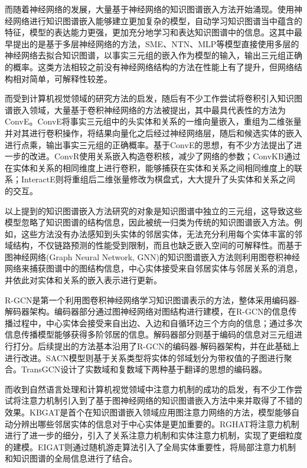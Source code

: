 而随着神经网络的发展，大量基于神经网络的知识图谱嵌入方法开始涌现。使用神经网络进行知识图谱嵌入能够建立更加复杂的模型，自动学习知识图谱当中蕴含的特征，模型的表达能力更强，更加充分地学习和表达知识图谱中的信息。这其中最早提出的是基于多层神经网络的方法，SME、NTN、MLP等模型直接使用多层的神经网络去拟合知识图谱，以事实三元组的嵌入作为模型的输入，输出三元组正确的概率。这类方法相较之前没有神经网络结构的方法在性能上有了提升，但网络结构相对简单，可解释性较差。

而受到计算机视觉领域的研究方法的启发，随后有不少工作尝试将卷积引入知识图谱嵌入领域，大量基于卷积神经网络的方法被提出，其中最具代表性的方法为ConvE。ConvE将事实三元组中的头实体和关系的一维向量嵌入，重组为二维张量并对其进行卷积操作，将结果向量化之后经过神经网络层，随后和候选实体的嵌入进行点乘，输出事实三元组的正确概率。基于ConvE的思想，有不少方法提出了进一步的改进。ConvR使用关系嵌入构造卷积核，减少了网络的参数；ConvKB通过在实体和关系的相同维度上进行卷积，能够捕获在实体和关系之间相同维度上的联系；InteractE则将重组后二维张量修改为棋盘式，大大提升了头实体和关系之间的交互。

以上提到的知识图谱嵌入方法研究的对象是知识图谱中独立的三元组，这导致这些模型忽略了知识图谱的结构信息，因此被统一归类为传统的知识图谱嵌入方法。例如，这些方法没有办法感知到头实体的邻居实体，无法充分利用每个实体丰富的邻域结构，不仅链路预测的性能受到限制，而且也缺乏嵌入空间的可解释性。而基于图神经网络(Graph Neural Network, GNN)的知识图谱嵌入方法则利用图卷积神经网络来捕获图谱中的图结构信息，中心实体接受来自邻居实体与邻居关系的消息，并依此对实体和关系的嵌入表示进行更新。

R-GCN是第一个利用图卷积神经网络学习知识图谱表示的方法，整体采用编码器-解码器架构。编码器部分通过图神经网络对图结构进行建模，在R-GCN的信息传播过程中，中心实体会接受来自出边、入边和自循环边三个方向的信息；通过多次信息传播模型能够获得多阶邻居的信息。解码器部分则基于编码的信息对三元组进行打分。后续提出的方法基本沿用了R-GCN的编码器-解码器架构，并在此基础上进行改进。SACN模型则基于关系类型将实体的邻域划分为带权值的子图进行聚合。TransGCN设计了实数域和复数域下两种基于翻译的思想的编码器。

而收到自然语言处理和计算机视觉领域中注意力机制的成功的启发，有不少工作尝试将注意力机制引入到了基于图神经网络的知识图谱嵌入方法中来并取得了不错的效果。KBGAT是首个在知识图谱嵌入领域应用图注意力网络的方法，模型能够自动分辨出哪些邻居实体的信息对于中心实体是更加重要的。RGHAT将注意力机制进行了进一步的细分，引入了关系注意力机制和实体注意力机制，实现了更细粒度的建模。EIGAT则通过随机游走算法引入了全局实体重要性，将局部注意力机制和知识图谱的全局信息进行了结合。

